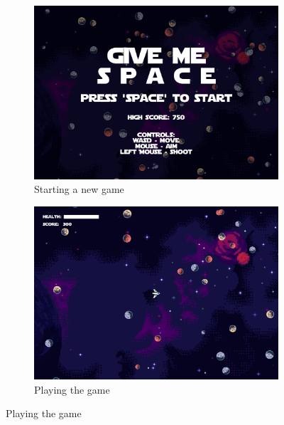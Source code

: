 \begin{figure}[H]
    \centering
    \begin{subfigure}[b]{0.45\textwidth}
        \centering
        \includegraphics[width=\textwidth]{Figures/day_3/menu.png}
        \caption{Starting a new game}
        \label{fig: space new game}
    \end{subfigure}
    \hspace{1cm}
    \begin{subfigure}[b]{0.45\textwidth}
        \centering
        \includegraphics[width=\textwidth]{Figures/day_3/game.png}
        \caption{Playing the game}
        \label{fig: space game}
    \end{subfigure}
    \label{fig: give me space}

\end{figure}

